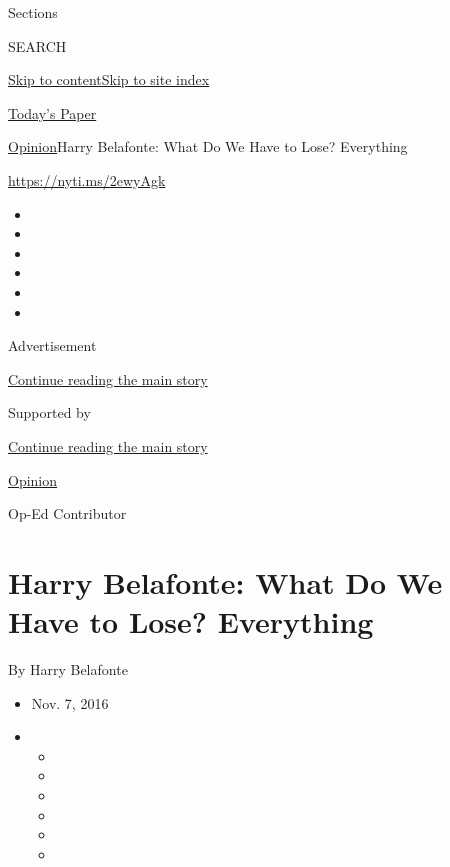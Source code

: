 Sections

SEARCH

\protect\hyperlink{site-content}{Skip to
content}\protect\hyperlink{site-index}{Skip to site index}

\href{https://myaccount.nytimes.com/auth/login?response_type=cookie\&client_id=vi}{}

\href{https://www.nytimes.com/section/todayspaper}{Today's Paper}

\href{/section/opinion}{Opinion}\textbar{}Harry Belafonte: What Do We
Have to Lose? Everything

\url{https://nyti.ms/2ewyAgk}

\begin{itemize}
\item
\item
\item
\item
\item
\item
\end{itemize}

Advertisement

\protect\hyperlink{after-top}{Continue reading the main story}

Supported by

\protect\hyperlink{after-sponsor}{Continue reading the main story}

\href{/section/opinion}{Opinion}

Op-Ed Contributor

\hypertarget{harry-belafonte-what-do-we-have-to-lose-everything}{%
\section{Harry Belafonte: What Do We Have to Lose?
Everything}\label{harry-belafonte-what-do-we-have-to-lose-everything}}

By Harry Belafonte

\begin{itemize}
\item
  Nov. 7, 2016
\item
  \begin{itemize}
  \item
  \item
  \item
  \item
  \item
  \item
  \end{itemize}
\end{itemize}

